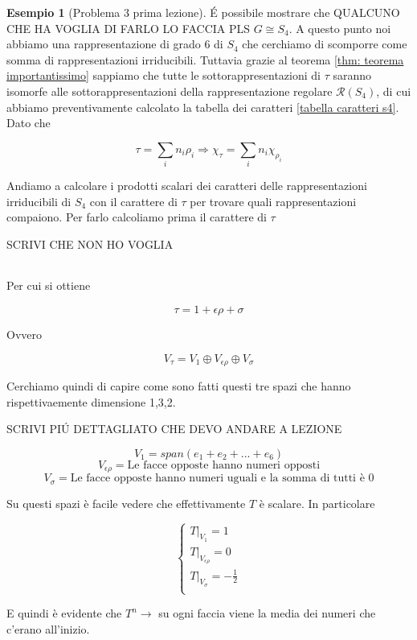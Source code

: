\documentclass[11pt]{article}
\theoremstyle{plain}
\theoremstyle{definition}
\newtheorem{exmp}{Esempio}[section]
\theoremstyle{remark}
\newcommand{\dsum}{\displaystyle\sum}
\begin{document}
\begin{exmp}[Problema 3 prima lezione]
\'E possibile mostrare che QUALCUNO CHE HA VOGLIA DI FARLO LO FACCIA PLS $G \cong S_4$. A questo punto noi abbiamo una rappresentazione di grado 6 di $S_4$ che cerchiamo di scomporre come somma di rappresentazioni irriducibili. Tuttavia grazie al teorema \ref{thm: teorema importantissimo} sappiamo che tutte le sottorappresentazioni di $\tau$ saranno isomorfe alle sottorappresentazioni della rappresentazione regolare $\mathcal{R}(S_4)$, di cui abbiamo preventivamente calcolato la tabella dei caratteri \ref{tabella caratteri s4}. Dato che 


\[\tau = \dsum_i n_i\rho_i \Rightarrow \chi_\tau  = \dsum_i n_i\chi_{\rho_i}\]

Andiamo a calcolare i prodotti scalari dei caratteri delle rappresentazioni irriducibili di $S_4$ con il carattere di $\tau$ per trovare quali rappresentazioni compaiono. Per farlo calcoliamo prima il carattere di $\tau$


SCRIVI CHE NON HO VOGLIA

\begin{table}[!ht]
\centering
\begin{tabular}{|c|c|c|c|c|c|}
\hline


\end{tabular}
\end{table} 



Per cui si ottiene

\[\tau = 1 + \epsilon\rho + \sigma \]

Ovvero

\[V_\tau = V_1 \oplus V_{\epsilon\rho} \oplus V_{\sigma} \]


Cerchiamo quindi di capire come sono fatti questi tre spazi che hanno rispettivaemente dimensione 1,3,2. 


SCRIVI PI\'U DETTAGLIATO CHE DEVO ANDARE A LEZIONE

\[V_1 =  span(e_1 + e_2 + ... + e_6) \]
\[V_{\epsilon\rho} = \text{Le facce opposte hanno numeri opposti}\]
\[V_{\sigma} = \text{Le facce opposte hanno numeri uguali e la somma di tutti è 0}\]

Su questi spazi è facile vedere che effettivamente $T$ è scalare. In particolare

\[
\begin{cases}
T|_{V_1} = 1 \\
T|_{V_{\epsilon\rho}} = 0 \\
T|_{V_\sigma} = -\frac{1}{2}\\
\end{cases}
\]

E quindi è evidente che $T^n \to $ su ogni faccia viene la media dei numeri che c'erano all'inizio.


\end{exmp}
\end{document}
